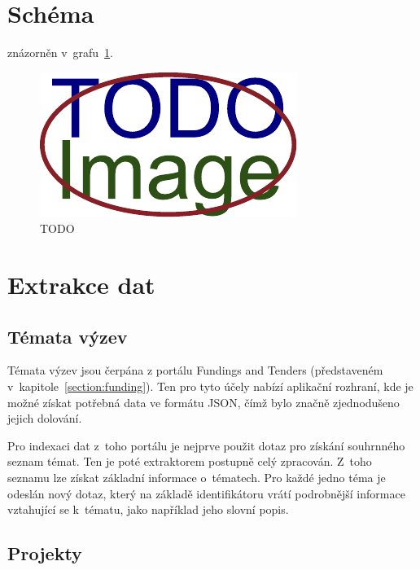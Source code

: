 \section{Schéma}
\blindtext znázorněn v~grafu~\ref{img:scheme}.

\begin{figure}[H]
	\centering
	\includegraphics[width=\textwidth]{obrazky-figures/placeholder.pdf}
	\caption{TODO}
	\label{img:scheme}
\end{figure}

\blindtext[2]

\section{Extrakce dat}
\blindtext

\subsection{Témata výzev}
Témata výzev jsou čerpána z portálu Fundings and Tenders (představeném v~kapitole~\ref{section:funding}).
Ten pro tyto účely nabízí aplikační rozhraní, kde je možné získat potřebná data ve formátu JSON, čímž bylo značně zjednodušeno jejich dolování. 

Pro indexaci dat z~toho portálu je nejprve použit dotaz pro získání souhrnného seznam témat. Ten je poté extraktorem postupně celý zpracován. Z~toho seznamu lze získat základní informace o~tématech. Pro každé jedno téma je odeslán nový dotaz, který na základě identifikátoru vrátí podrobnější informace vztahující se k~tématu, jako například jeho slovní popis.

\subsection{Projekty}
\blindtext


